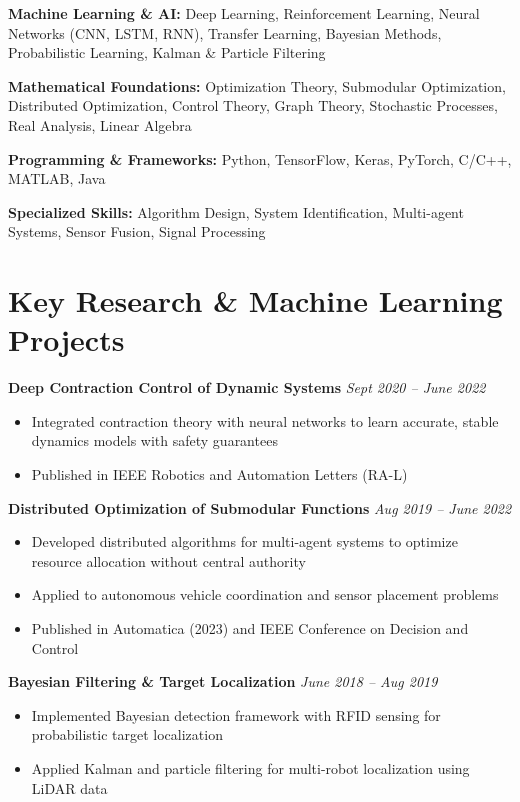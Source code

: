\documentclass[11pt,letterpaper]{article}
\begin{document}
\textbf{Machine Learning \& AI:} Deep Learning, Reinforcement Learning, Neural Networks (CNN, LSTM, RNN), Transfer Learning, Bayesian Methods, Probabilistic Learning, Kalman \& Particle Filtering

\textbf{Mathematical Foundations:} Optimization Theory, Submodular Optimization, Distributed Optimization, Control Theory, Graph Theory, Stochastic Processes, Real Analysis, Linear Algebra

\textbf{Programming \& Frameworks:} Python, TensorFlow, Keras, PyTorch, C/C++, MATLAB, Java

\textbf{Specialized Skills:} Algorithm Design, System Identification, Multi-agent Systems, Sensor Fusion, Signal Processing

\section*{Key Research \& Machine Learning Projects}

\textbf{Deep Contraction Control of Dynamic Systems} \hfill \textit{Sept 2020 -- June 2022}
\begin{itemize}[leftmargin=*, itemsep=0pt, parsep=2pt]
    \item Integrated contraction theory with neural networks to learn accurate, stable dynamics models with safety guarantees
    \item Published in IEEE Robotics and Automation Letters (RA-L)
\end{itemize}

\textbf{Distributed Optimization of Submodular Functions} \hfill \textit{Aug 2019 -- June 2022}
\begin{itemize}[leftmargin=*, itemsep=0pt, parsep=2pt]
    \item Developed distributed algorithms for multi-agent systems to optimize resource allocation without central authority
    \item Applied to autonomous vehicle coordination and sensor placement problems
    \item Published in Automatica (2023) and IEEE Conference on Decision and Control
\end{itemize}

\textbf{Bayesian Filtering \& Target Localization} \hfill \textit{June 2018 -- Aug 2019}
\begin{itemize}[leftmargin=*, itemsep=0pt, parsep=2pt]
    \item Implemented Bayesian detection framework with RFID sensing for probabilistic target localization
    \item Applied Kalman and particle filtering for multi-robot localization using LiDAR data
\end{itemize}
\end{document}
